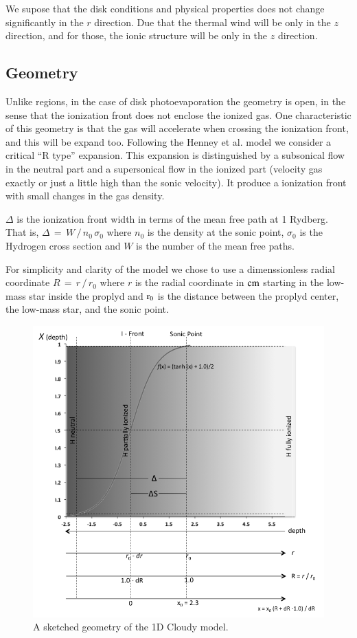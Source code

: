 \documentclass[aaspp]{article}
\begin{document}
We supose that the disk conditions and physical properties does not change significantly in the $r$ direction. Due that the thermal wind will be only in the $z$ direction, and for those, the ionic structure will be only in the $z$ direction.

\subsection{Geometry}
\label{sec:geometry}

Unlike \hii regions, in the case of disk photoevaporation the geometry is open, in the sense that the ionization front does not enclose the ionized gas. One characteristic of this geometry is that the gas will accelerate when crossing the ionization front, and this will be expand too.
Following the Henney et al. model we consider a critical ``R type'' expansion. This expansion is distinguished by a subsonical flow in the neutral part and a supersonical flow in the ionized part (velocity gas exactly or just a little high than the sonic velocity). It produce a ionization front with small changes in the gas density.

$\Delta$ is the ionization front width in terms of the mean free path at 1 Rydberg. That is, $\Delta \, = \, W \, / \, n_0 \, \sigma_0$ where $n_0$ is the density at the sonic point, $\sigma_0$ is the Hydrogen cross section and $W$ is the number of the mean free paths.

For simplicity and clarity of the model we chose to use a dimenssionless radial coordinate $R \,=\, r\,/\,r_0$ where $r$ is the radial coordinate in $\rm cm$ starting in the low-mass star inside the proplyd and $\rm r_0$ is the distance between the proplyd center, the low-mass star, and the sonic point.

\begin{figure}[h]
\centering
  \includegraphics[width=8.5 cm]{./IFront/ifront.png}
  \caption{A sketched geometry of the 1D Cloudy model.} \label{fig:1Dgeom}
\end{figure}
\end{document}
